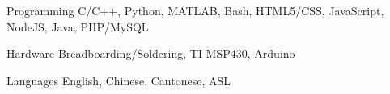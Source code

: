 \texttt{}%



\begin{cvskills}


\cvskill
{Programming} %
{C/C++, Python, MATLAB, Bash, HTML5/CSS, JavaScript, NodeJS, Java, PHP/MySQL} %


\cvskill
{Hardware} %
{Breadboarding/Soldering, TI-MSP430, Arduino} %


\cvskill
{Languages} %
{English, Chinese, Cantonese, ASL} %


\end{cvskills}